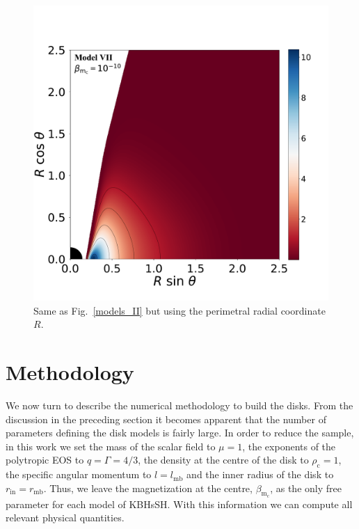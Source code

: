 \documentclass[twocolumn,aps,showpacs,showkeys,prd,superscriptaddress,byrevtex, amsmath]{revtex4-1}
\begin{document}
\begin{figure}
\hspace{-0.2cm}
\includegraphics[scale=0.14]{figures/fig4_VII__10.pdf}
\hspace{-0.2cm}
\caption{Same as Fig.~\ref{models_II} but using the perimetral radial coordinate $R$.}
\label{models_peri_II}
\end{figure}

\section{Methodology}
\label{procedure}

We now turn to describe the numerical methodology to build the disks. From the discussion in the preceding section it becomes apparent that the number of parameters defining the disk models is fairly large. In order to reduce the sample, in this work we set the mass of the scalar field to $\mu = 1$, the exponents of the polytropic EOS to $q = \Gamma = 4/3$, the density at the centre of the disk to $\rho_{\mathrm{c}} = 1$, the specific angular momentum to $l = l_{\mathrm{mb}}$ and the inner radius of the disk to $r_{\mathrm{in}} = r_{\mathrm{mb}}$. Thus, we leave the magnetization at the centre, $\beta_{\mathrm{m_c}}$, as the only free parameter for each model of KBHsSH. With this information we can compute all relevant physical quantities.
\end{document}
